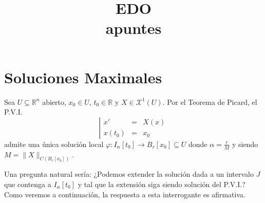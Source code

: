 \documentclass[11pt,a4paper]{article}
\title{\textbf{EDO}\\
	\large apuntes}
\author{}
\date{}
\theoremstyle{definition}
\theoremstyle{plain}
\theoremstyle{remark}
\begin{document}
	\section{Soluciones Maximales}
	Sea $U \subseteq \mathbb{R}^n$ abierto, $x_0 \in U$, $t_0 \in \mathbb{R}$ y $X \in \mathcal{X}^1(U)$. Por el Teorema de Picard, el P.V.I.
	\begin{equation*}
		\left| 
		\begin{array}{lcl}
			x' &=& X(x) \\
			x(t_0) &=& x_0
		\end{array}
		\right.
	\end{equation*}
	admite una única solución local $\varphi : I_\alpha[t_0] \to B_r[x_0] \subseteq U$ donde $\alpha = \frac{r}{M}$ y siendo $M = \|X\|_{C(B_r[x_0])}$.
	
	Una pregunta natural sería: ¿Podemos extender la solución dada a un intervalo $J$ que contenga a $I_\alpha[t_0]$ y tal que la extensión siga siendo solución del P.V.I.? Como veremos a continuación, la respuesta a esta interrogante es afirmativa.
	
\end{document}
